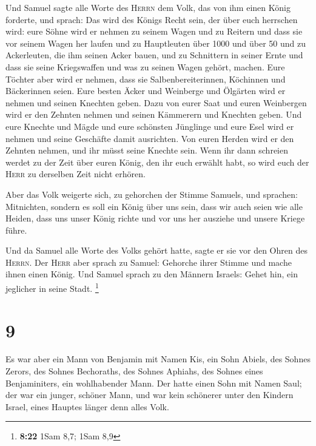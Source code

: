  Und Samuel sagte alle Worte des \textsc{Herrn} dem Volk,
das von ihm einen König forderte,  und sprach: Das wird
des Königs Recht sein, der über euch herrschen wird: eure Söhne wird er
nehmen zu seinem Wagen und zu Reitern und dass sie vor seinem Wagen her
laufen  und zu Hauptleuten über 1000 und über 50 und zu
Ackerleuten, die ihm seinen Acker bauen, und zu Schnittern in seiner
Ernte und dass sie seine Kriegswaffen und was zu seinen Wagen gehört,
machen.  Eure Töchter aber wird er nehmen, dass sie
Salbenbereiterinnen, Köchinnen und Bäckerinnen seien. 
Eure besten Äcker und Weinberge und Ölgärten wird er nehmen und seinen
Knechten geben.  Dazu von eurer Saat und euren Weinbergen
wird er den Zehnten nehmen und seinen Kämmerern und Knechten geben.
 Und eure Knechte und Mägde und eure schönsten Jünglinge
und eure Esel wird er nehmen und seine Geschäfte damit ausrichten.
 Von euren Herden wird er den Zehnten nehmen, und ihr
müsst seine Knechte sein.  Wenn ihr dann schreien werdet
zu der Zeit über euren König, den ihr euch erwählt habt, so wird euch
der \textsc{Herr} zu derselben Zeit nicht erhören.

 Aber das Volk weigerte sich, zu gehorchen der Stimme
Samuels, und sprachen: Mitnichten, sondern es soll ein König über uns
sein,  dass wir auch seien wie alle Heiden, dass uns
unser König richte und vor uns her ausziehe und unsere Kriege führe.

 Und da Samuel alle Worte des Volks gehört hatte, sagte
er sie vor den Ohren des \textsc{Herrn}.  Der
\textsc{Herr} aber sprach zu Samuel: Gehorche ihrer Stimme und mache
ihnen einen König. Und Samuel sprach zu den Männern Israels: Gehet hin,
ein jeglicher in seine Stadt. \footnote{\textbf{8:22} 1Sam 8,7; 1Sam 8,9}

\hypertarget{section-2}{%
\section{9}\label{section-2}}

 Es war aber ein Mann von Benjamin mit Namen Kis, ein Sohn
Abiels, des Sohnes Zerors, des Sohnes Bechoraths, des Sohnes Aphiahs,
des Sohnes eines Benjaminiters, ein wohlhabender Mann. 
Der hatte einen Sohn mit Namen Saul; der war ein junger, schöner Mann,
und war kein schönerer unter den Kindern Israel, eines Hauptes länger
denn alles Volk.

